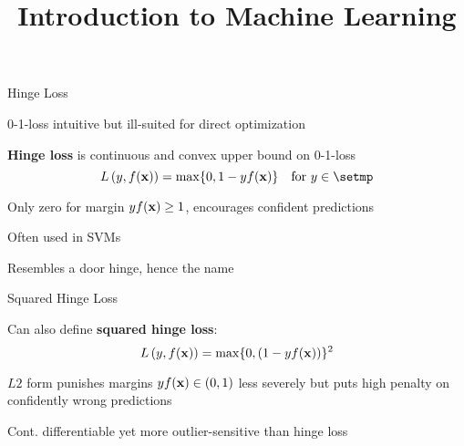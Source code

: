 \documentclass[11pt,compress,t,notes=noshow, xcolor=table]{beamer}
\title{Introduction to Machine Learning}
\begin{document}
    

\begin{framei}[sep=M]{Hinge Loss}

\item 0-1-loss intuitive but ill-suited for direct optimization
\item \textbf{Hinge loss} is continuous and convex 
upper bound on 0-1-loss 
$$\Lxy = \max \{ 0, 1 - \yf \} \quad \text{for} \ y \in \setmp$$
\item Only zero for margin $y f(\mathbf{x})\geq 1$, 
encourages confident predictions
\item Often used in SVMs
\item Resembles a door hinge, hence the name


\end{framei}


\begin{framei}[sep=M]{Squared Hinge Loss}

\item Can also define \textbf{squared hinge loss}:
$$L\left(y, f(\mathbf{x})\right) = \max \{ 0, (1 - yf(\mathbf{x}))\}^2$$
\item $L2$ form punishes margins $yf(\mathbf{x}) \in (0, 1)$ less severely but puts high penalty on confidently wrong predictions
\item Cont. differentiable yet more outlier-sensitive than hinge loss



\end{framei}
\end{document}
